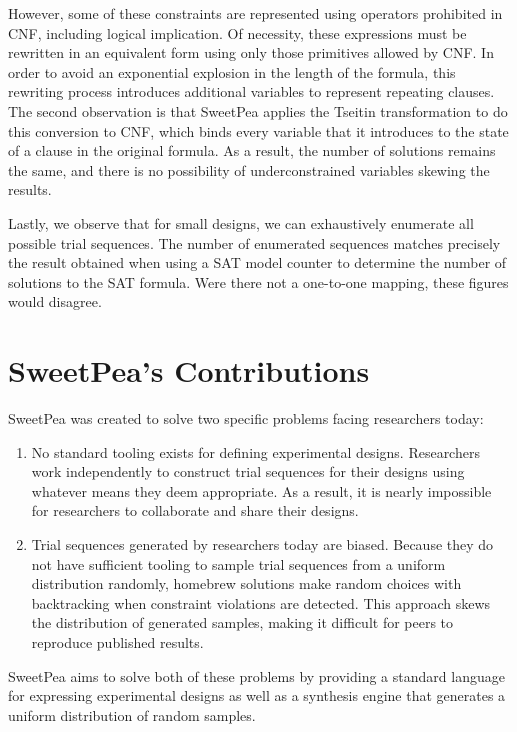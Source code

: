 However, some of these constraints are represented using operators prohibited in CNF, including logical implication. Of necessity, these expressions must be rewritten in an equivalent form using only those primitives allowed by CNF. In order to avoid an exponential explosion in the length of the formula, this rewriting process introduces additional variables to represent repeating clauses. The second observation is that SweetPea applies the Tseitin transformation to do this conversion to CNF, which binds every variable that it introduces to the state of a clause in the original formula. As a result, the number of solutions remains the same, and there is no possibility of underconstrained variables skewing the results.

Lastly, we observe that for small designs, we can exhaustively enumerate all possible trial sequences. The number of enumerated sequences matches precisely the result obtained when using a SAT model counter to determine the number of solutions to the SAT formula. Were there not a one-to-one mapping, these figures would disagree.


\section{SweetPea's Contributions}

SweetPea was created to solve two specific problems facing researchers today:

\begin{enumerate}
\item No standard tooling exists for defining experimental designs. Researchers work independently to construct trial sequences for their designs using whatever means they deem appropriate. As a result, it is nearly impossible for researchers to collaborate and share their designs.
\item Trial sequences generated by researchers today are biased. Because they do not have sufficient tooling to sample trial sequences from a uniform distribution randomly, homebrew solutions make random choices with backtracking when constraint violations are detected. This approach skews the distribution of generated samples, making it difficult for peers to reproduce published results.
  \end{enumerate}

SweetPea aims to solve both of these problems by providing a standard language for expressing experimental designs as well as a synthesis engine that generates a uniform distribution of random samples.



